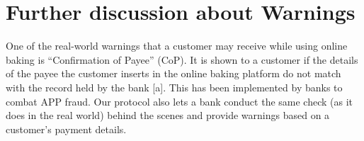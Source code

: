 

\section{Further discussion about Warnings}\label{warnings}

One of the real-world warnings that a customer may receive while using online baking is ``Confirmation of Payee'' (CoP). It is shown to a customer if the details of the payee the customer inserts in the online baking platform do not match with the record held by the bank [a]. This has been implemented by banks to combat APP fraud. Our protocol also lets a bank conduct the same check (as it does in the real world) behind the scenes and provide warnings based on a customer's payment details.
